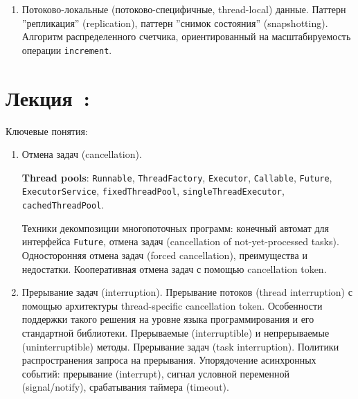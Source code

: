 \documentclass[a4paper, 12pt]{extarticle}
\begin{document}
\begin{enumerate}[\thesection .1]
	\textbf{ReadWriteLock}. Предпочтение читающего или пишущего потока. Усиление (read-to-write promotion) и ослабление (write-to-read downgrade). На примере этой структуры данных проиллюстрируйте следующие многопоточные дефекты: проблема потерянного сигнала (lost signal), устаревание условия (predicate invalidation), внезапное пробуждение (spurious wakeup), грохочущее стадо (thundering herd), инверсия приоритета (priority inversion), голодание (starvation),  состояние тупика (deadlock). Возможно вам понадобится разъяснить отсутствие перечисленных проблем в структуре данных. 

	\item Потоково-локальные (потоково-специфичные, thread-local) данные. Паттерн ''репликация'' (replication), паттерн ''снимок состояния'' (snapshotting). Алгоритм распределенного счетчика, ориентированный на масштабируемость операции \texttt{increment}.
	

\end{enumerate}


\section{Лекция~\patternsNum: \patternsTopic}

Ключевые понятия: \patternsKey

\begin{enumerate}[\thesection .1]

	\item Отмена задач (cancellation).

	\textbf{Thread pools}: \texttt{Runnable}, \texttt{ThreadFactory}, \texttt{Executor}, \texttt{Callable}, \texttt{Future}, \texttt{ExecutorService}, \texttt{fixedThreadPool}, \texttt{singleThreadExecutor}, \texttt{cachedThreadPool}.

	Техники декомпозиции многопоточных программ: конечный автомат для интерфейса \texttt{Future}, отмена задач (cancellation of not-yet-processed tasks). Односторонняя отмена задач (forced cancellation), преимущества и недостатки. Кооперативная отмена задач с помощью cancellation token.

	\item Прерывание задач (interruption). 	
	Прерывание потоков (thread interruption) с помощью архитектуры thread-specific cancellation token. Особенности поддержки такого решения на уровне языка программирования и его стандартной библиотеки. Прерываемые (interruptible) и непрерываемые (uninterruptible) методы. Прерывание задач (task interruption). Политики распространения запроса на прерывания.
	Упорядочение асинхронных событий: прерывание (interrupt), сигнал условной переменной (signal/notify), срабатывания таймера (timeout).

\end{enumerate}
\end{document}
